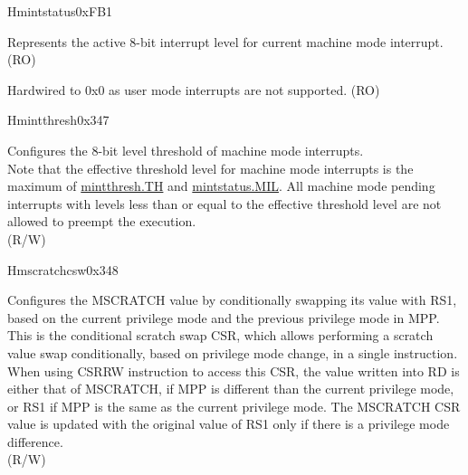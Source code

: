 \begin{register}{H}{mintstatus}{0xFB1}
\label{regdesc:MINTSTATUS}
%
%
%
\regnewline%
\begin{regdesc}\begin{reglist}
\label{fielddesc:MINTSTATUS_MIL}\item [MIL] Represents the active 8-bit interrupt level for current machine mode interrupt. (RO)
\label{fielddesc:MINTSTATUS_UIL}\item [UIL] Hardwired to 0x0 as user mode interrupts are not supported. (RO)
\end{reglist}\end{regdesc}
\end{register}

\begin{register}{H}{mintthresh}{0x347}\label{regdesc:MINTTHRESH}
%
%
\regnewline%
\begin{regdesc}\begin{reglist}
\label{fielddesc:MINTTHRESH_TH}\item [TH] Configures the 8-bit level threshold of machine mode interrupts. \\
Note that the effective threshold level for machine mode interrupts is the maximum of \hyperref[fielddesc:MINTTHRESH_TH]{{mintthresh.TH}} and \hyperref[fielddesc:MINTSTATUS_MIL]{{mintstatus.MIL}}. All machine mode pending interrupts with levels less than or equal to the effective threshold level are not allowed to preempt the execution.\\(R/W)
\end{reglist}\end{regdesc}
\end{register}

\begin{register}{H}{mscratchcsw}{0x348}\label{regdesc:MSCRATCHCSW_REG}
%
\regnewline%
\begin{regdesc}\begin{reglist}
\label{fielddesc:MSCRATCHCSW}\item [MSCRATCHCSW] Configures the MSCRATCH value by conditionally swapping its value with RS1, based on the current privilege mode and the previous privilege mode in MPP.\\
This is the conditional scratch swap CSR, which allows performing a scratch value swap conditionally, based on privilege mode change, in a single instruction.\\
When using CSRRW instruction to access this CSR, the value written into RD is either that of MSCRATCH, if MPP is different than the current privilege mode, or RS1 if MPP is the same as the current privilege mode. The MSCRATCH CSR value is updated with the original value of RS1 only if there is a privilege mode difference. \\
(R/W)
\end{reglist}\end{regdesc}
\end{register}

